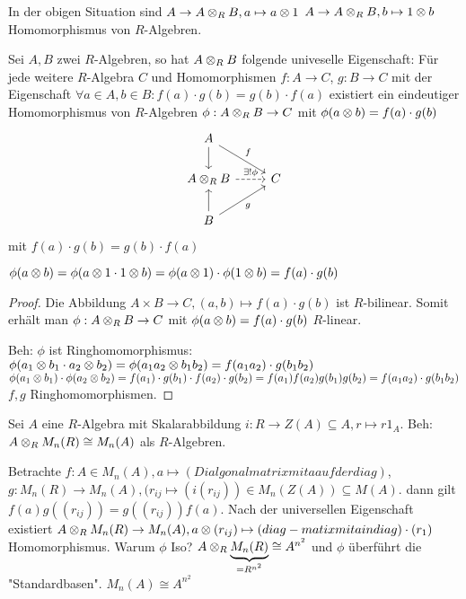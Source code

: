 \documentclass[../main.tex]{subfiles}
\begin{document}
\begin{remark}
    In der obigen Situation sind $A\rightarrow A\otimes_R B, a\mapsto a\otimes 1$
    $A\rightarrow A\otimes_R B,b\mapsto 1\otimes b$%
    Homomorphismus von $R$-Algebren.
\end{remark}
\begin{theorem}
    Sei $A,B$ zwei $R$-Algebren, so hat $A\otimes_R B$ folgende univeselle Eigenschaft:
    Für jede weitere $R$-Algebra $C$ und Homomorphismen $f:A\rightarrow C$, $g:B\rightarrow C$ mit der Eigenschaft $\forall a\in A, b\in B: f(a)\cdot g(b) = g(b) \cdot f(a)$
    existiert ein eindeutiger Homomorphismus von $R$-Algebren $\phi:A\otimes_R B\rightarrow C$ mit $\phi(a\otimes b) = f(a)\cdot g(b)$
    $$%
\begin{tikzcd}
A \arrow[rd, "f"] \arrow[d]                 &   \\
A\ot_R B \arrow[r, "\exists !\phi", dashed] & C \\
B \arrow[u] \arrow[ru, "g"']                &  
\end{tikzcd}$$ mit $f(a)\cdot g(b) = g(b)\cdot f(a)$

$\phi(a\otimes b) = \phi(a\otimes 1 \cdot 1\otimes b) = \phi(a\otimes 1)\cdot \phi(1\otimes b) = f(a)\cdot g(b)$
\end{theorem}
\begin{proof}
    Die Abbildung $A\times B\rightarrow C, (a,b) \mapsto f(a)\cdot g(b)$ ist $R$-bilinear.
    Somit erhält man $\phi: A\otimes_R B \rightarrow C$ mit $\phi(a\otimes b) = f(a)\cdot g(b)$ $R$-linear.

    Beh: $\phi$ ist Ringhomomorphismus:
    $\phi(a_1\otimes b_1 \cdot a_2 \otimes b_2) =\phi(a_1a_2\otimes b_1b_2) = f(a_1a_2) \cdot g(b_1b_2)$
    $\phi(a_1\otimes b_1) \cdot \phi(a_2\otimes b_2) = f(a_1)\cdot g(b_1)\cdot f(a_2)\cdot g(b_2) =f(a_1)f(a_2)g(b_1)g(b_2) = f(a_1a_2)\cdot g(b_1b_2)$
    $f,g$ Ringhomomorphismen.
\end{proof}
\begin{example}
    Sei $A$ eine $R$-Algebra mit Skalarabbildung $i:R\rightarrow Z(A)\subseteq A, r\mapsto r1_A$.
    Beh: $A\otimes_R M_n(R)\cong M_n(A)$ als $R$-Algebren.

    Betrachte $f:A\in M_n(A), a\mapsto (Dialgonalmatrix mit a auf der diag)$, $g:M_n(R)\rightarrow M_n(A), (r_{ij}\mapsto (i(r_{ij}))\in M_n(Z(A)) \subseteq M(A)$.
    dann gilt $f(a)g((r_{ij})) = g((r_{ij})) f(a)$.
    Nach der universellen Eigenschaft existiert $A\otimes_R M_n(R) \rightarrow M_n(A), a\otimes (r_{ij}) \mapsto (diag-matix mit a in diag) \cdot (r_1)$ Homomorphismus.
    Warum $\phi$ Iso? $A\otimes_R \underbrace{M_n(R)}_{=R^{n^2}}\cong A^{n^2}$ und $\phi$ überführt die "Standardbasen".
    $M_n(A)\cong A^{n^2}$
\end{example}
\end{document}
